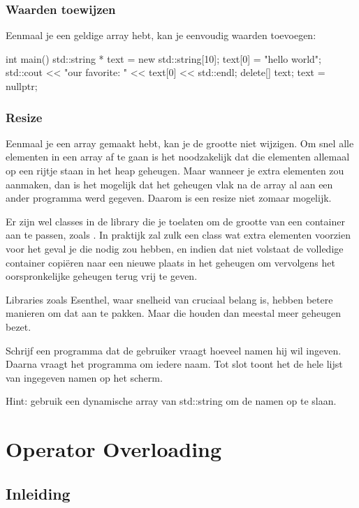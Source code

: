 \documentclass[11pt, oldfontcommands, oneside, a4paper]{memoir}
\begin{document}
\subsection{Waarden toewijzen}
Eenmaal je een geldige array hebt, kan je eenvoudig waarden toevoegen:

\begin{code}
int main() {
  std::string * text = new std::string[10];
  text[0] = "hello world";
  std::cout << "our favorite: " << text[0] << std::endl; 
  delete[] text;
  text = nullptr;
}
\end{code}

\subsection{Resize}
Eenmaal je een array gemaakt hebt, kan je de grootte niet wijzigen. Om snel alle elementen in een array af te gaan is het noodzakelijk dat die elementen allemaal op een rijtje staan in het heap geheugen. Maar wanneer je extra elementen zou aanmaken, dan is het mogelijk dat het geheugen vlak na de array al aan een ander programma werd gegeven. Daarom is een resize niet zomaar mogelijk. 

Er zijn wel classes in de library die je toelaten om de grootte van een container aan te passen, zoals . In praktijk zal zulk een class wat extra elementen voorzien voor het geval je die nodig zou hebben, en indien dat niet volstaat de volledige container copi\"eren naar een nieuwe plaats in het geheugen om vervolgens het oorspronkelijke geheugen terug vrij te geven.

Libraries zoals Esenthel, waar snelheid van cruciaal belang is, hebben betere manieren om dat aan te pakken. Maar die houden dan meestal meer geheugen bezet.

\begin{exercise}
Schrijf een programma dat de gebruiker vraagt hoeveel namen hij wil ingeven. Daarna vraagt het programma om iedere naam. Tot slot toont het de hele lijst van ingegeven namen op het scherm.

Hint: gebruik een dynamische array van std::string om de namen op te slaan.
\end{exercise}

\chapter{Operator Overloading}
\section{Inleiding}
\end{document}
